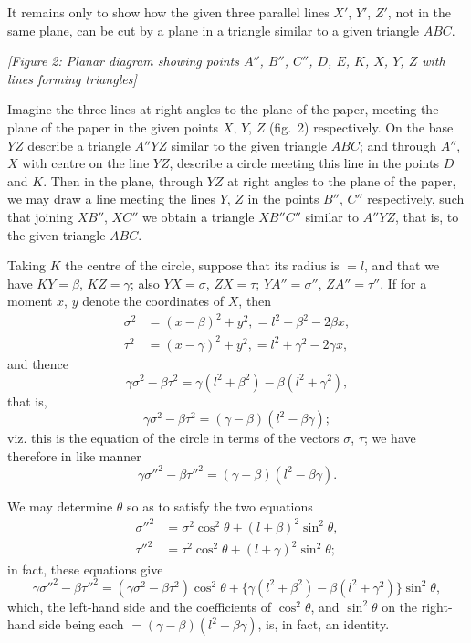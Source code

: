 \documentclass[11pt,a4paper]{book}
\begin{document}
It remains only to show how the given three parallel lines $X'$, $Y'$, $Z'$, not in the same plane, can be cut by a plane in a triangle similar to a given triangle $ABC$.

\begin{center}
\textit{[Figure 2: Planar diagram showing points $A''$, $B''$, $C''$, $D$, $E$, $K$, $X$, $Y$, $Z$ with lines forming triangles]}
\end{center}

Imagine the three lines at right angles to the plane of the paper, meeting the plane of the paper in the given points $X$, $Y$, $Z$ (fig.~2) respectively. On the base $YZ$ describe a triangle $A''YZ$ similar to the given triangle $ABC$; and through $A''$, $X$ with centre on the line $YZ$, describe a circle meeting this line in the points $D$ and $K$. Then in the plane, through $YZ$ at right angles to the plane of the paper, we may draw a line meeting the lines $Y$, $Z$ in the points $B''$, $C''$ respectively, such that joining $XB''$, $XC''$ we obtain a triangle $XB''C''$ similar to $A''YZ$, that is, to the given triangle $ABC$.

Taking $K$ the centre of the circle, suppose that its radius is $= l$, and that we have $KY = \beta$, $KZ = \gamma$; also $YX = \sigma$, $ZX = \tau$; $YA'' = \sigma''$, $ZA'' = \tau''$. If for a moment $x$, $y$ denote the coordinates of $X$, then
\begin{align*}
\sigma^2 &= (x-\beta)^2 + y^2, = l^2 + \beta^2 - 2\beta x,\\
\tau^2 &= (x-\gamma)^2 + y^2, = l^2 + \gamma^2 - 2\gamma x,
\end{align*}
and thence
\[
\gamma\sigma^2 - \beta\tau^2 = \gamma(l^2 + \beta^2) - \beta(l^2 + \gamma^2),
\]
that is,
\[
\gamma\sigma^2 - \beta\tau^2 = (\gamma - \beta)(l^2 - \beta\gamma);
\]
viz. this is the equation of the circle in terms of the vectors $\sigma$, $\tau$; we have therefore in like manner
\[
\gamma\sigma''^2 - \beta\tau''^2 = (\gamma - \beta)(l^2 - \beta\gamma).
\]

We may determine $\theta$ so as to satisfy the two equations
\begin{align*}
\sigma''^2 &= \sigma^2 \cos^2\theta + (l + \beta)^2 \sin^2\theta,\\
\tau''^2 &= \tau^2 \cos^2\theta + (l + \gamma)^2 \sin^2\theta;
\end{align*}
in fact, these equations give
\[
\gamma\sigma''^2 - \beta\tau''^2 = (\gamma\sigma^2 - \beta\tau^2)\cos^2\theta + \{\gamma(l^2+\beta^2) - \beta(l^2+\gamma^2)\}\sin^2\theta,
\]
which, the left-hand side and the coefficients of $\cos^2\theta$, and $\sin^2\theta$ on the right-hand side being each $= (\gamma-\beta)(l^2-\beta\gamma)$, is, in fact, an identity.
\end{document}
